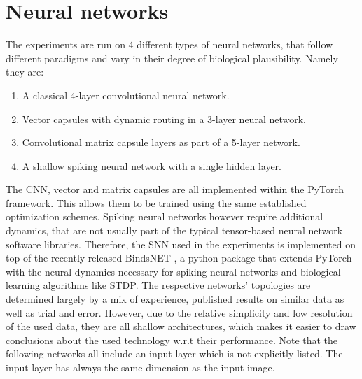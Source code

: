 \section{Neural networks}
The experiments are run on 4 different types of neural networks, that follow different paradigms and vary in their degree of biological plausibility. Namely they are:
\begin{enumerate}
    \item A classical 4-layer convolutional neural network.
    \item Vector capsules with dynamic routing in a 3-layer neural network.
    \item Convolutional matrix capsule layers as part of a 5-layer network.
    \item A shallow spiking neural network with a single hidden layer.
\end{enumerate}
The CNN, vector and matrix capsules are all implemented within the PyTorch \cite{paszke2017automatic} framework. This allows them to be trained using the same established optimization schemes. Spiking neural networks however require additional dynamics, that are not usually part of the typical tensor-based neural network software libraries. Therefore, the SNN used in the experiments is implemented on top of the recently released BindsNET \cite{2018arXiv180601423H}, a python package that extends PyTorch with the neural dynamics necessary for spiking neural networks and biological learning algorithms like STDP. The respective networks' topologies are determined largely by a mix of experience, published results on similar data as well as trial and error. However, due to the relative simplicity and low resolution of the used data, they are all shallow architectures, which makes it easier to draw conclusions about the used technology w.r.t their performance. Note that the following networks all include an input layer which is not explicitly listed. The input layer has always the same dimension as the input image.
